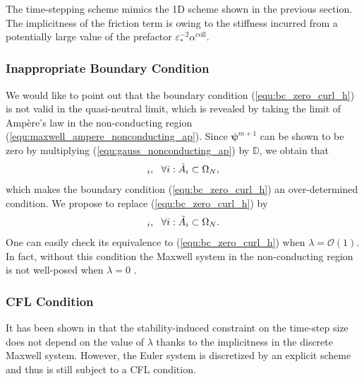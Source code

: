 \documentclass{article}
\begin{document}
The time-stepping scheme mimics the 1D scheme shown in the previous section. The implicitness of the friction term is owing to the stiffness incurred from a potentially large value of the prefactor $\varepsilon^{-2}_*\alpha^\text{coll}$.

\subsubsection{Inappropriate Boundary Condition} \label{sec:inapp_bc}
We would like to point out that the boundary condition (\ref{equ:bc_zero_curl_h}) is not valid in the quasi-neutral limit, which is revealed by taking the limit of Amp\`{e}re's law in the non-conducting region (\ref{equ:maxwell_ampere_nonconducting_ap}). Since $\bm{\psi}^{m+1}$ can be shown to be zero by multiplying (\ref{equ:gauss_nonconducting_ap}) by $\mathbb{D}$, we obtain that
\begin{equation*}
    [\Tilde{\mathbb{C}}\mathbf{h}^{m+1} = 0]_i, \ \ \forall i : \Tilde{A}_i \subset \Omega_N,
\end{equation*}
which makes the boundary condition (\ref{equ:bc_zero_curl_h}) an over-determined condition. We propose to replace (\ref{equ:bc_zero_curl_h}) by 
\begin{equation*}
    [\mathbf{d}^{m+1} = 0]_i, \ \ \forall i : \Tilde{A}_i \subset \Omega_N.
\end{equation*}
One can easily check its equivalence to (\ref{equ:bc_zero_curl_h}) when $\lambda = \mathcal{O}(1)$. In fact, without this condition the Maxwell system in the non-conducting region is not well-posed when $\lambda = 0$ \cite{alfredo_2003}. 

\subsubsection{CFL Condition}
It has been shown in \cite{degond_2012} that the stability-induced constraint on the time-step size does not depend on the value of $\lambda$ thanks to the implicitness in the discrete Maxwell system. However, the Euler system is discretized by an explicit scheme and thus is still subject to a CFL condition.
\end{document}
